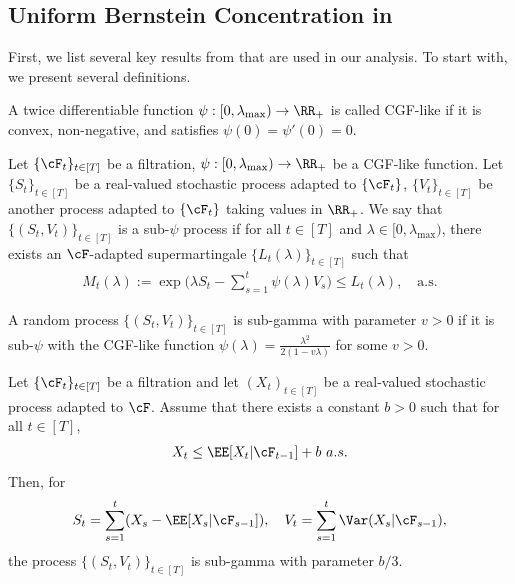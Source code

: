 \documentclass[11pt]{article}
\begin{document}
\subsection{Uniform Bernstein Concentration in \citet{bakhtiari2026eluder}}
First, we list several key results from \citet{bakhtiari2026eluder} that are used in our analysis. To start with, we present several definitions.
\begin{definition}
A twice differentiable function $\psi:[0,\lambda_{\max})\to\RR_+$ is called CGF-like if it is convex, non-negative, and satisfies $\psi(0)=\psi'(0)=0$.
\end{definition}
\begin{definition}
    Let $\{\cF_t\}_{t\in [T]}$ be a filtration, $\psi: [0,\lambda_{\max}) \to \RR_+$ be a CGF-like function. Let $\{S_t\}_{t\in[T]}$ be a real-valued stochastic process adapted to $\{\cF_t\}$, $\{V_t\}_{t\in[T]}$ be another process adapted to $\{\cF_t\}$ taking values in $\RR_+$. We say that $\{(S_t,V_t)\}_{t\in[T]}$ is a sub-$\psi$ process if for all $t \in [T]$ and $\lambda \in [0,\lambda_{\max})$, there exists an $\cF$-adapted supermartingale $\{L_t(\lambda)\}_{t\in[T]}$ such that 
    \begin{align*}
        M_t(\lambda) := \exp\Big(\lambda S_t - \sum_{s=1}^t \psi(\lambda)V_s\Big) \le L_t(\lambda), \quad \text{a.s.}
    \end{align*}
\end{definition}
\begin{definition}
    A random process $\{(S_t,V_t)\}_{t \in [T]}$ is sub-gamma with parameter $v > 0$ if it is sub-$\psi$ with the CGF-like function $\psi(\lambda) = \frac{\lambda^2 }{2(1-v\lambda)}$ for some $v > 0$.
    
\end{definition}
\begin{lemma}\label{lem:bakhtiari11}
    Let $\{\cF_t\}_{t\in [T]}$ be a filtration and let $(X_t)_{t \in [T]}$ be a real-valued stochastic process adapted to $\cF$. Assume that there exists a constant $b > 0$ such that for all $t \in [T]$,
    \begin{align*}
        X_t \le \EE[X_t | \cF_{t-1}] + b \ a.s.
    \end{align*}
    Then, for 
    \begin{align*}
        S_t = \sum_{s=1}^t (X_s - \EE[X_s | \cF_{s-1}]), \quad V_t = \sum_{s=1}^t \Var(X_s | \cF_{s-1}),
    \end{align*}
    the process $\{(S_t,V_t)\}_{t \in [T]}$ is sub-gamma with parameter $b/3$.
\end{lemma}
\end{document}
